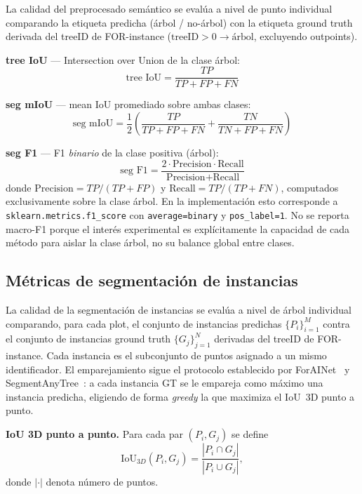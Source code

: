\documentclass[runningheads]{llncs}
\begin{document}
La calidad del preprocesado sem\'antico se eval\'ua a nivel de punto individual comparando la etiqueta predicha (\'arbol / no-\'arbol) con la etiqueta ground truth derivada del treeID de FOR-instance ($\text{treeID} > 0 \rightarrow \text{\'arbol}$, excluyendo outpoints).

\textbf{tree IoU} --- Intersection over Union de la clase \'arbol:
\begin{equation}
\text{tree IoU} = \frac{TP}{TP + FP + FN}
\end{equation}

\textbf{seg mIoU} --- mean IoU promediado sobre ambas clases:
\begin{equation}
\text{seg mIoU} = \frac{1}{2}\left(\frac{TP}{TP+FP+FN} + \frac{TN}{TN+FP+FN}\right)
\end{equation}

\textbf{seg F1} --- F1 \emph{binario} de la clase positiva (\'arbol):
\begin{equation}
\text{seg F1} = \frac{2 \cdot \text{Precision} \cdot \text{Recall}}{\text{Precision} + \text{Recall}}
\end{equation}
donde $\text{Precision} = TP / (TP + FP)$ y $\text{Recall} = TP / (TP + FN)$, computados exclusivamente sobre la clase \'arbol. En la implementaci\'on esto corresponde a \texttt{sklearn.metrics.f1\_score} con \texttt{average=\textquotesingle binary\textquotesingle} y \texttt{pos\_label=1}. No se reporta macro-F1 porque el inter\'es experimental es expl\'icitamente la capacidad de cada m\'etodo para aislar la clase \'arbol, no su balance global entre clases.

\subsection{M\'etricas de segmentaci\'on de instancias}

La calidad de la segmentaci\'on de instancias se eval\'ua a nivel de \'arbol individual comparando, para cada plot, el conjunto de instancias predichas $\{P_i\}_{i=1}^{M}$ contra el conjunto de instancias ground truth $\{G_j\}_{j=1}^{N}$ derivadas del treeID de FOR-instance. Cada instancia es el subconjunto de puntos asignado a un mismo identificador. El emparejamiento sigue el protocolo establecido por ForAINet~\cite{henrich2024} y SegmentAnyTree~\cite{wielgosz2024}: a cada instancia GT se le empareja como m\'aximo una instancia predicha, eligiendo de forma \emph{greedy} la que maximiza el IoU~3D punto a punto.

\textbf{IoU 3D punto a punto.} Para cada par $(P_i, G_j)$ se define
\begin{equation}
\text{IoU}_{3D}(P_i, G_j) = \frac{|P_i \cap G_j|}{|P_i \cup G_j|},
\end{equation}
donde $|\cdot|$ denota n\'umero de puntos.
\end{document}
